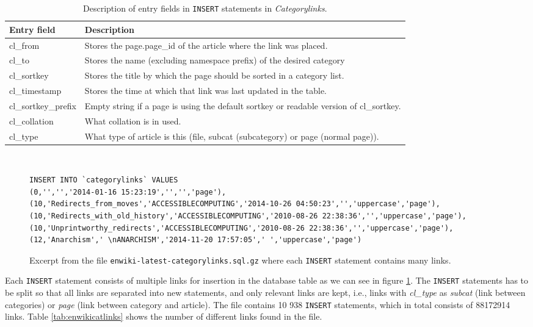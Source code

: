 \begin{table}[ht]
\renewcommand{\arraystretch}{1.25}
\begin{tabularx}{\textwidth}{l|X}
\textbf{Entry field} &  \textbf{Description} \\ \hline
cl\_from & Stores the page.page\_id of the article where the link was placed. \\ \hline
cl\_to & Stores the name (excluding namespace prefix) of the desired category \\  \hline
cl\_sortkey & Stores the title by which the page should be sorted in a category list. \\ \hline
cl\_timestamp & Stores the time at which that link was last updated in the table. \\ \hline
cl\_sortkey\_prefix & Empty string if a page is using the default sortkey or readable version of cl\_sortkey. \\ \hline
cl\_collation & What collation is in used. \\ \hline
cl\_type & What type of article is this (file, subcat (subcategory) or page (normal page)).
\end{tabularx}
\\[10pt]
\caption[Description of entry fields in \emph{Categorylinks}]{Description of entry fields in \texttt{INSERT} statements in \emph{Categorylinks}.}
\label{tab:insertdescription}
\end{table}


\begin{figure}[ht]
\begin{lstlisting}
INSERT INTO `categorylinks` VALUES 
(0,'','','2014-01-16 15:23:19','','','page'),
(10,'Redirects_from_moves','ACCESSIBLECOMPUTING','2014-10-26 04:50:23','','uppercase','page'),
(10,'Redirects_with_old_history','ACCESSIBLECOMPUTING','2010-08-26 22:38:36','','uppercase','page'),
(10,'Unprintworthy_redirects','ACCESSIBLECOMPUTING','2010-08-26 22:38:36','','uppercase','page'),
(12,'Anarchism',' \nANARCHISM','2014-11-20 17:57:05',' ','uppercase','page')
\end{lstlisting}
\caption[Excerpt from \texttt{enwiki-latest-categorylinks.sql.gz}]{Excerpt from the file \texttt{enwiki-latest-categorylinks.sql.gz} where each \texttt{INSERT} statement contains many links.}
\label{fig:categorylinks}
\end{figure}

Each \texttt{INSERT} statement consists of multiple links for insertion in the database table as we can see in figure \ref{fig:categorylinks}. The \texttt{INSERT} statements has to be split so that all links are separated into new statements, and only relevant links are kept, i.e.,  links with \emph{cl\_type} as \emph{subcat} (link between categories) or \emph{page} (link between category and article). The file \enwikicatlink contains 10 938 \texttt{INSERT} statements, which in total consists of 88172914 links. Table \ref{tab:enwikicatlinks} shows the number of different links found in the file. 

